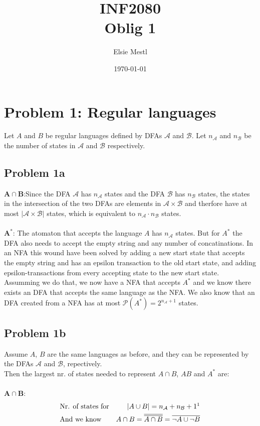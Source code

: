 \documentclass{article}
\title{INF2080\\Oblig 1}
\date{\today}
\author{Elsie Mestl}
\begin{document}
\maketitle


\section{Problem 1: Regular languages}
Let $A$ and $B$ be regular languages defined by DFAs $\mathcal A$ and $\mathcal B$. Let $n_\mathcal A$ and $n_\mathcal B$ be the number of states in $\mathcal A$ and $\mathcal B$ respectively.

\subsection{Problem 1a}
$\boldsymbol{A\cap B}$:\quad Since the DFA $\mathcal A$ has $n_\mathcal A$ states and the DFA $\mathcal B$ has $n_\mathcal B$ states, the states in the intersection of the two DFAs are elements in $\mathcal A \times \mathcal B$ and therfore have at most $|\mathcal A \times \mathcal B|$ states, which is equivalent to $n_\mathcal A \cdot n_\mathcal B $ states.
\\ \ \\
$\boldsymbol{A^*}$: \quad The atomaton that accepts the language $A$ has $n_\mathcal A$ states. But for $A^*$ the DFA also needs to accept the empty string and any number of concatinations. In an NFA this wound have been solved by adding a new start state that accepts the empty string and has an epsilon transaction to the old start state, and adding epsilon-transactions from every accepting state to the new start state. Assumming we do that, we now have a NFA that accepts $A^*$ and we know there exists an DFA that accepts the same language as the NFA. We also know that an DFA created from a NFA has at most $\mathcal{P}(A^*)  = 2^{n_\mathcal A + 1} $ states.

\subsection{Problem 1b}
Assume $A$, $B$ are the same languages as before, and they can be represented by the DFAs $\mathcal A$ and $\mathcal B$, repectively.
\\
Then the largest nr. of states needed to represent $A\cap B$, $AB$ and $A^*$ are: \\ \ \\
$\boldsymbol{A\cap B}$:
\begin{align*}
  &\text{Nr. of states for} &|A\cup B| = n_\mathcal A + n_\mathcal B + 1\footnotemark&\\
  &\text{And we know} &A\cap B = \overline{\overline{A\cap B}} = \overline{\neg A\cup \neg B}&
\end{align*}
\end{document}
